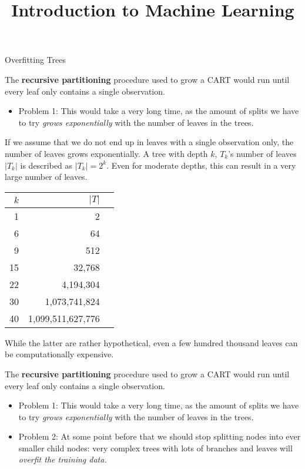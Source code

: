 \documentclass[11pt,compress,t,notes=noshow, xcolor=table]{beamer}
\title{Introduction to Machine Learning}
\institute{\href{https://compstat-lmu.github.io/lecture_i2ml/}{compstat-lmu.github.io/lecture\_i2ml}}
\date{}
\begin{document}
\sloppy

\begin{vbframe}{Overfitting Trees}

The \textbf{recursive partitioning} procedure used to grow a CART would run until every leaf only contains a single observation. 
\begin{itemize}
\item Problem 1: This would take a very long time, as the amount of splits we have to try \emph{grows exponentially} with the number of leaves in the trees.
\end{itemize}

If we assume that we do not end up in leaves with a single observation only, the number of leaves grows exponentially. A tree with depth $k$, $T_k$'s number of leaves $|T_k|$ is described as $|T_k| = 2^k$. Even for moderate depths, this can result in a very large number of leaves.

\begin{table}[ht]
\centering
\tiny
\begin{tabular}{rrr}
  \hline
  $k$ & $|T|$ \\ 
  \hline
  1 & 2 \\ 
  6 & 64 \\ 
  9 & 512 \\ 
  15 & 32,768 \\ 
  22 & 4,194,304 \\ 
  30 & 1,073,741,824 \\ 
  40 & 1,099,511,627,776 \\ 
   \hline
\end{tabular}
\end{table}

While the latter are rather hypothetical, even a few hundred thousand leaves can be computationally expensive.

\framebreak

The \textbf{recursive partitioning} procedure used to grow a CART would run until every leaf only contains a single observation. 
\begin{itemize}
\item Problem 1: This would take a very long time, as the amount of splits we have to try \emph{grows exponentially} with the number of leaves in the trees.
\item Problem 2: At some point before that we should stop splitting nodes into ever smaller child nodes: very complex trees with lots of branches and leaves will \emph{overfit the training data.}


\end{itemize}
\end{vbframe}
\end{document}
